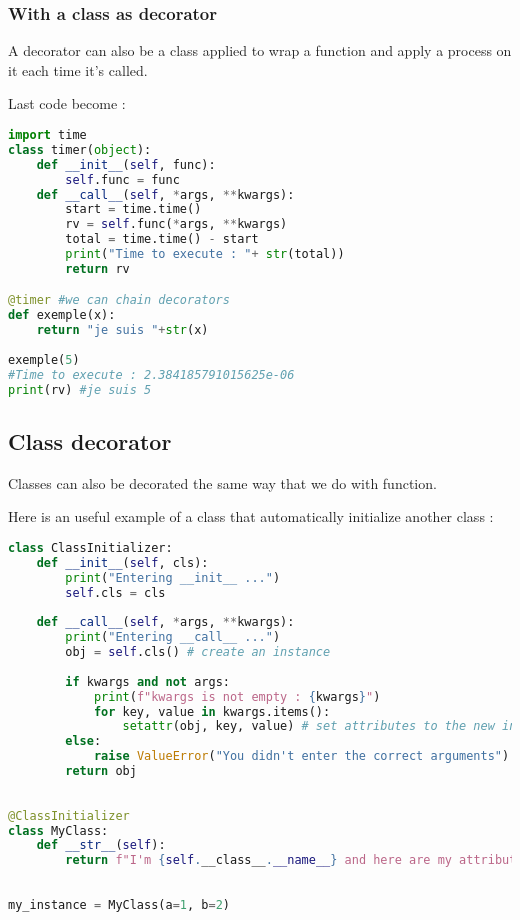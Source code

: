 \documentclass[a4paper, 12pt, titlepage]{scrartcl} %
\begin{document}
\subsubsection{With a class as decorator}
A decorator can also be a class applied to wrap a function and apply a process on it each time it's called.

\vspace{5mm}

Last code become :
\begin{lstlisting}[language=Python]
import time
class timer(object):
    def __init__(self, func):
        self.func = func
    def __call__(self, *args, **kwargs):
        start = time.time()
		rv = self.func(*args, **kwargs)
		total = time.time() - start
		print("Time to execute : "+ str(total))
		return rv

@timer #we can chain decorators
def exemple(x):
	return "je suis "+str(x)
	
exemple(5)
#Time to execute : 2.384185791015625e-06
print(rv) #je suis 5
\end{lstlisting} \vspace{5mm}

\subsection{Class decorator}
Classes can also be decorated the same way that we do with function.

\vspace{5mm}

Here is an useful example of a class that automatically initialize another class :
\begin{lstlisting}[language=Python]
class ClassInitializer:
    def __init__(self, cls):
        print("Entering __init__ ...")
        self.cls = cls
 
    def __call__(self, *args, **kwargs):
        print("Entering __call__ ...")
        obj = self.cls() # create an instance
 
        if kwargs and not args:
            print(f"kwargs is not empty : {kwargs}")
            for key, value in kwargs.items():
                setattr(obj, key, value) # set attributes to the new instance
        else:
            raise ValueError("You didn't enter the correct arguments")
        return obj
 
 
@ClassInitializer
class MyClass:
    def __str__(self):
        return f"I'm {self.__class__.__name__} and here are my attributes : {self.__dict__}"
 
 
my_instance = MyClass(a=1, b=2)
\end{lstlisting} \vspace{5mm}
\end{document}
